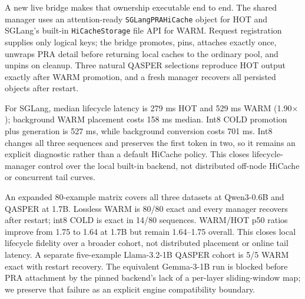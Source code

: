 \documentclass[10pt]{article}
\begin{document}
A new live bridge makes that ownership executable end to end. The shared
manager uses an attention-ready \texttt{SGLangPRAHiCache} object for HOT and
SGLang's built-in \texttt{HiCacheStorage} file API for WARM. Request
registration supplies only logical keys; the bridge promotes, pins, attaches
exactly once, unwraps PRA detail before returning local caches to the ordinary
pool, and unpins on cleanup. Three natural QASPER selections reproduce HOT
output exactly after WARM promotion, and a fresh manager recovers all persisted
objects after restart.

\begin{table}[!htbp]
\centering
\scriptsize
\caption{Shared three-example live storage probe. Ratios include promotion and
generation but exclude background tier transitions.}
\resizebox{\linewidth}{!}{%
}
\label{tab:sglang-live-storage}
\end{table}

For SGLang, median lifecycle latency is 279 ms HOT and 529 ms WARM
(1.90$\times$); background WARM placement costs 158 ms median. Int8 COLD
promotion plus generation is 527 ms, while background conversion costs 701 ms.
Int8 changes all three sequences and preserves the first token in two, so it
remains an explicit diagnostic rather than a default HiCache policy. This
closes lifecycle-manager control over the local built-in backend, not
distributed off-node HiCache or concurrent tail curves.

An expanded 80-example matrix covers all three datasets at Qwen3-0.6B and
QASPER at 1.7B. Lossless WARM is 80/80 exact and every manager recovers after
restart; int8 COLD is exact in 14/80 sequences. WARM/HOT p50 ratios improve
from 1.75 to 1.64 at 1.7B but remain 1.64--1.75 overall. This closes local
lifecycle fidelity over a broader cohort, not distributed placement or online
tail latency. A separate five-example Llama-3.2-1B QASPER cohort is 5/5 WARM
exact with restart recovery. The equivalent Gemma-3-1B run is blocked before
PRA attachment by the pinned backend's lack of a per-layer sliding-window map;
we preserve that failure as an explicit engine compatibility boundary.

\begin{table}[!htbp]
\centering
\scriptsize
\caption{Expanded SGLang-MLX lifecycle cohorts. Latencies include synchronous
promotion and generation.}
\resizebox{\linewidth}{!}{%
}
\label{tab:sglang-storage-scaling}
\end{table}
\end{document}
